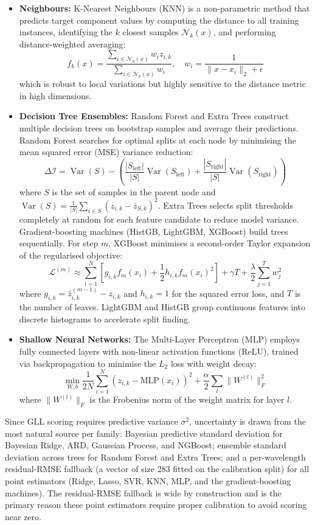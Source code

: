 \documentclass[12pt]{article}
\begin{document}
\begin{itemize}
\item \textbf{Neighbours:} K-Nearest Neighbours (KNN) is a non-parametric method that predicts target component values by computing the distance to all training instances, identifying the $k$ closest samples $\mathcal{N}_k(x)$, and performing distance-weighted averaging:
\[
f_k(x) = \frac{\sum_{i \in \mathcal{N}_k(x)} w_i z_{i,k}}{\sum_{i \in \mathcal{N}_k(x)} w_i}, \quad w_i = \frac{1}{\|x - x_i\|_2 + \epsilon}
\]
which is robust to local variations but highly sensitive to the distance metric in high dimensions.

\item \textbf{Decision Tree Ensembles:} Random Forest and Extra Trees construct multiple decision trees on bootstrap samples and average their predictions. Random Forest searches for optimal splits at each node by minimising the mean squared error (MSE) variance reduction:
\[
\Delta \mathcal{I} = \operatorname{Var}(S) - \left( \frac{|S_{\text{left}}|}{|S|} \operatorname{Var}(S_{\text{left}}) + \frac{|S_{\text{right}}|}{|S|} \operatorname{Var}(S_{\text{right}}) \right)
\]
where $S$ is the set of samples in the parent node and $\operatorname{Var}(S) = \frac{1}{|S|} \sum_{i \in S} (z_{i,k} - \bar{z}_{S,k})^2$. Extra Trees selects split thresholds completely at random for each feature candidate to reduce model variance. Gradient-boosting machines (HistGB, LightGBM, XGBoost) build trees sequentially. For step $m$, XGBoost minimises a second-order Taylor expansion of the regularised objective:
\[
\mathcal{L}^{(m)} \approx \sum_{i=1}^N \left[ g_{i,k} f_m(x_i) + \frac{1}{2} h_{i,k} f_m(x_i)^2 \right] + \gamma T + \frac{\lambda}{2} \sum_{j=1}^T w_j^2
\]
where $g_{i,k} = \hat{z}_{i,k}^{(m-1)} - z_{i,k}$ and $h_{i,k} = 1$ for the squared error loss, and $T$ is the number of leaves. LightGBM and HistGB group continuous features into discrete histograms to accelerate split finding.

\item \textbf{Shallow Neural Networks:} The Multi-Layer Perceptron (MLP) employs fully connected layers with non-linear activation functions (ReLU), trained via backpropagation to minimise the $L_2$ loss with weight decay:
\[
\min_{W, b} \frac{1}{2N} \sum_{i=1}^N \left(z_{i,k} - \text{MLP}(x_i)\right)^2 + \frac{\alpha}{2} \sum_l \|W^{(l)}\|_F^2
\]
where $\|W^{(l)}\|_F$ is the Frobenius norm of the weight matrix for layer $l$.
\end{itemize}

Since GLL scoring requires predictive variance $\sigma^2$, uncertainty is drawn from the most natural source per family: Bayesian predictive standard deviation for Bayesian Ridge, ARD, Gaussian Process, and NGBoost; ensemble standard deviation across trees for Random Forest and Extra Trees; and a per-wavelength residual-RMSE fallback (a vector of size 283 fitted on the calibration split) for all point estimators (Ridge, Lasso, SVR, KNN, MLP, and the gradient-boosting machines). The residual-RMSE fallback is wide by construction and is the primary reason these point estimators require proper calibration to avoid scoring near zero.
\end{document}
